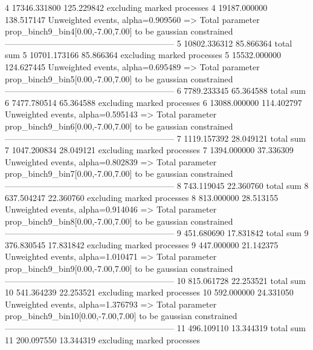 4          17346.331800    125.229842      excluding marked processes    
4          19187.000000    138.517147      Unweighted events, alpha=0.909560
  => Total parameter prop_binch9_bin4[0.00,-7.00,7.00] to be gaussian constrained
------------------------------------------------------------
5          10802.336312    85.866364       total sum                     
5          10701.173166    85.866364       excluding marked processes    
5          15532.000000    124.627445      Unweighted events, alpha=0.695489
  => Total parameter prop_binch9_bin5[0.00,-7.00,7.00] to be gaussian constrained
------------------------------------------------------------
6          7789.233345     65.364588       total sum                     
6          7477.780514     65.364588       excluding marked processes    
6          13088.000000    114.402797      Unweighted events, alpha=0.595143
  => Total parameter prop_binch9_bin6[0.00,-7.00,7.00] to be gaussian constrained
------------------------------------------------------------
7          1119.157392     28.049121       total sum                     
7          1047.200834     28.049121       excluding marked processes    
7          1394.000000     37.336309       Unweighted events, alpha=0.802839
  => Total parameter prop_binch9_bin7[0.00,-7.00,7.00] to be gaussian constrained
------------------------------------------------------------
8          743.119045      22.360760       total sum                     
8          637.504247      22.360760       excluding marked processes    
8          813.000000      28.513155       Unweighted events, alpha=0.914046
  => Total parameter prop_binch9_bin8[0.00,-7.00,7.00] to be gaussian constrained
------------------------------------------------------------
9          451.680690      17.831842       total sum                     
9          376.830545      17.831842       excluding marked processes    
9          447.000000      21.142375       Unweighted events, alpha=1.010471
  => Total parameter prop_binch9_bin9[0.00,-7.00,7.00] to be gaussian constrained
------------------------------------------------------------
10         815.061728      22.253521       total sum                     
10         541.364239      22.253521       excluding marked processes    
10         592.000000      24.331050       Unweighted events, alpha=1.376793
  => Total parameter prop_binch9_bin10[0.00,-7.00,7.00] to be gaussian constrained
------------------------------------------------------------
11         496.109110      13.344319       total sum                     
11         200.097550      13.344319       excluding marked processes    
